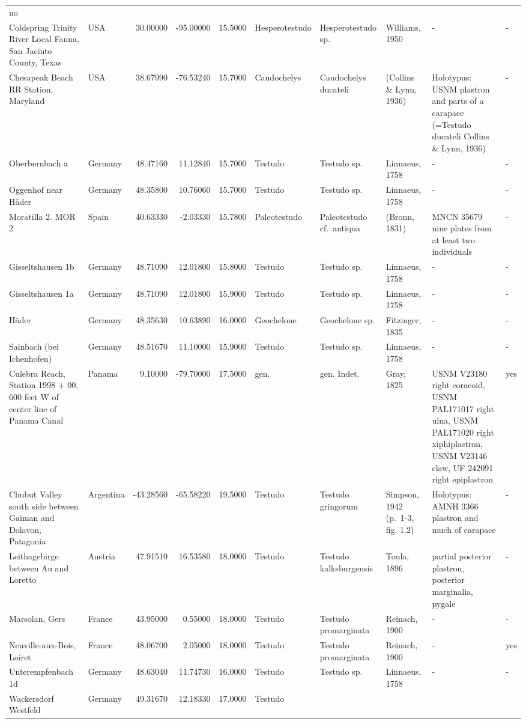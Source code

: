 \documentclass[]{article}
\begin{document}
\begin{longtable}[]{@{}llrrrlllll@{}}
no\tabularnewline
Coldspring Trinity River Local Fauna, San Jacinto County, Texas & USA &
30.00000 & -95.00000 & 15.5000 & Hesperotestudo & Hesperotestudo sp. &
Williams, 1950 & - & -\tabularnewline
Chesapeak Beach RR Station, Maryland & USA & 38.67990 & -76.53240 &
15.7000 & Caudochelys & Caudochelys ducateli & (Collins \& Lynn, 1936) &
Holotypus: USNM plastron and parts of a carapace (=Testudo ducateli
Collins \& Lynn, 1936) & -\tabularnewline
Oberbernbach a & Germany & 48.47160 & 11.12840 & 15.7000 & Testudo &
Testudo sp. & Linnaeus, 1758 & - & -\tabularnewline
Oggenhof near Häder & Germany & 48.35800 & 10.76060 & 15.7000 & Testudo
& Testudo sp. & Linnaeus, 1758 & - & -\tabularnewline
Moratilla 2. MOR 2 & Spain & 40.63330 & -2.03330 & 15.7800 &
Paleotestudo & Paleotestudo cf.~antiqua & (Bronn, 1831) & MNCN 35679
nine plates from at least two individuals & -\tabularnewline
Gisseltshausen 1b & Germany & 48.71090 & 12.01800 & 15.8000 & Testudo &
Testudo sp. & Linnaeus, 1758 & - & -\tabularnewline
Gisseltshausen 1a & Germany & 48.71090 & 12.01800 & 15.9000 & Testudo &
Testudo sp. & Linnaeus, 1758 & - & -\tabularnewline
Häder & Germany & 48.35630 & 10.63890 & 16.0000 & Geochelone &
Geochelone sp. & Fitzinger, 1835 & - & -\tabularnewline
Sainbach (bei Ichenhofen) & Germany & 48.51670 & 11.10000 & 15.9000 &
Testudo & Testudo sp. & Linnaeus, 1758 & - & -\tabularnewline
Culebra Reach, Station 1998 + 00, 600 feet W of center line of Panama
Canal & Panama & 9.10000 & -79.70000 & 17.5000 & gen. & gen. Indet. &
Gray, 1825 & USNM V23180 right coracoid, USNM PAL171017 right ulna, USNM
PAL171020 right xiphiplastron, USNM V23146 claw, UF 242091 right
epiplastron & yes\tabularnewline
Chubut Valley south side between Gaiman and Dolavon, Patagonia &
Argentina & -43.28560 & -65.58220 & 19.5000 & Testudo & Testudo
gringorum & Simpson, 1942 (p.~1-3, fig. 1.2) & Holotypus: AMNH 3366
plastron and much of carapace & -\tabularnewline
Leithagebirge between Au and Loretto & Austria & 47.91510 & 16.53580 &
18.0000 & Testudo & Testudo kalksburgensis & Toula, 1896 & partial
posterior plastron, posterior marginalia, pygale & -\tabularnewline
Marsolan, Gers & France & 43.95000 & 0.55000 & 18.0000 & Testudo &
Testudo promarginata & Reinach, 1900 & - & -\tabularnewline
Neuville-aux-Bois, Loiret & France & 48.06700 & 2.05000 & 18.0000 &
Testudo & Testudo promarginata & Reinach, 1900 & - & yes\tabularnewline
Unterempfenbach 1d & Germany & 48.63040 & 11.74730 & 16.0000 & Testudo &
Testudo sp. & Linnaeus, 1758 & - & -\tabularnewline
Wackersdorf Westfeld & Germany & 49.31670 & 12.18330 & 17.0000 & Testudo

\end{longtable}
\end{document}
